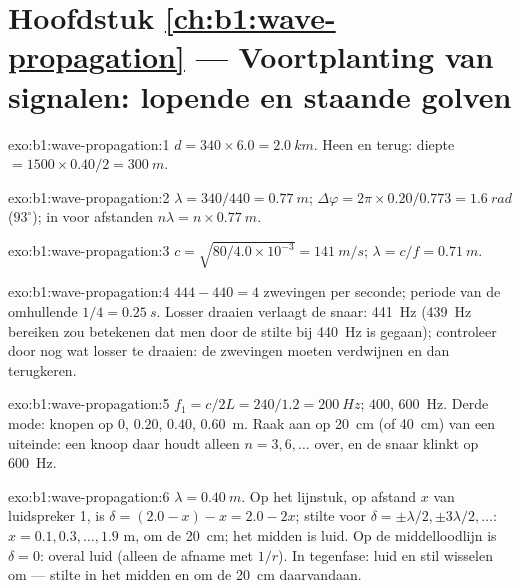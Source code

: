 \section*{Hoofdstuk \ref{ch:b1:wave-propagation} --- Voortplanting van signalen: lopende en staande golven}

\begin{solution}{exo:b1:wave-propagation:1}
$d = 340 \times 6.0 = \qty{2.0}{km}$. Heen en terug: diepte $= 1500 \times
0.40/2 = \qty{300}{m}$.
\end{solution}

\begin{solution}{exo:b1:wave-propagation:2}
$\lambda = 340/440 = \qty{0.77}{m}$; $\Delta\varphi = 2\pi \times
0.20/0.773 = \qty{1.6}{rad}$ ($93^\circ$); in  voor afstanden
$n\lambda = n \times \qty{0.77}{m}$.
\end{solution}

\begin{solution}{exo:b1:wave-propagation:3}
$c = \sqrt{80/4.0\times10^{-3}} = \qty{141}{m/s}$; $\lambda = c/f =
\qty{0.71}{m}$.
\end{solution}

\begin{solution}{exo:b1:wave-propagation:4}
$444 - 440 = 4$ zwevingen per seconde; periode van de omhullende $1/4 = \qty{0.25}{s}$.
Losser draaien verlaagt de snaar: \qty{441}{Hz} (\qty{439}{Hz} bereiken zou
betekenen dat men door de stilte bij \qty{440}{Hz} is gegaan); controleer door
nog wat losser te draaien: de zwevingen moeten verdwijnen en dan terugkeren.
\end{solution}

\begin{solution}{exo:b1:wave-propagation:5}
$f_1 = c/2L = 240/1.2 = \qty{200}{Hz}$; $400$, \qty{600}{Hz}. Derde mode:
knopen op $0$, $0.20$, $0.40$, \qty{0.60}{m}. Raak aan op \qty{20}{cm} (of
\qty{40}{cm}) van een uiteinde: een knoop daar houdt alleen $n = 3, 6, \dots$ over, en
de snaar klinkt op \qty{600}{Hz}.
\end{solution}

\begin{solution}{exo:b1:wave-propagation:6}
$\lambda = \qty{0.40}{m}$. Op het lijnstuk, op afstand $x$ van luidspreker
1, is $\delta = (2.0 - x) - x = 2.0 - 2x$; stilte voor $\delta = \pm\lambda/2,
\pm 3\lambda/2, \dots$: $x = 0.1, 0.3, \dots, 1.9$ m, om de \qty{20}{cm};
het midden is luid. Op de middelloodlijn is $\delta = 0$: overal luid (alleen
de afname met $1/r$). In tegenfase: luid en stil wisselen om --- stilte in het
midden en om de \qty{20}{cm} daarvandaan.
\end{solution}

